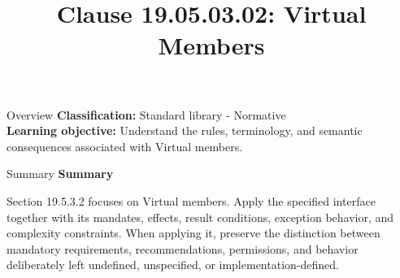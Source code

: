 \documentclass[10pt,letterpaper]{article}
\title{Clause 19.05.03.02: Virtual Members}
\author{}
\date{}
\begin{document}
\maketitle
\begin{CornellOverviewBox}{Overview}
\textbf{Classification:} Standard library - Normative\\[2pt]
\textbf{Learning objective:} Understand the rules, terminology, and semantic consequences associated with Virtual members.
\end{CornellOverviewBox}\begin{CornellSummaryBox}{Summary}
{\sffamily\bfseries\color{Accent} Summary}\par\vspace{3pt}Section 19.5.3.2 focuses on Virtual members. Apply the specified interface together with its mandates, effects, result conditions, exception behavior, and complexity constraints. When applying it, preserve the distinction between mandatory requirements, recommendations, permissions, and behavior deliberately left undefined, unspecified, or implementation-defined.
\end{CornellSummaryBox}
\end{document}
